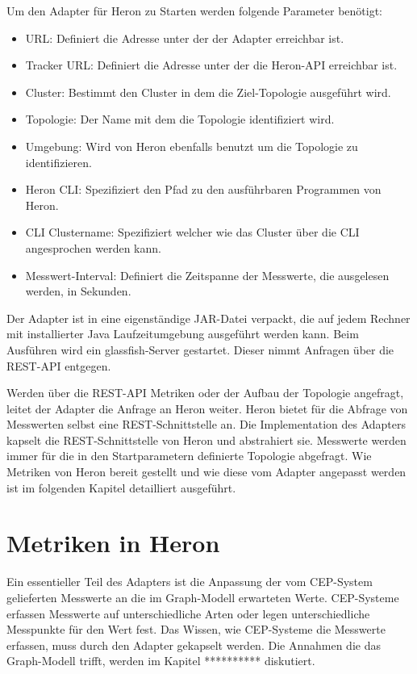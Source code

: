 Um den Adapter für Heron zu Starten werden folgende Parameter benötigt:
\begin{itemize}
\item{URL: Definiert die Adresse unter der der Adapter erreichbar ist.}
\item{Tracker URL: Definiert die Adresse unter der die Heron-API erreichbar ist.}
\item{Cluster: Bestimmt den Cluster in dem die Ziel-Topologie ausgeführt wird.}
\item{Topologie: Der Name mit dem die Topologie identifiziert wird.}
\item{Umgebung: Wird von Heron ebenfalls benutzt um die Topologie zu identifizieren.}
\item{Heron CLI: Spezifiziert den Pfad zu den ausführbaren Programmen von Heron.}
\item{CLI Clustername: Spezifiziert welcher wie das Cluster über die CLI angesprochen werden kann.}
\item{Messwert-Interval: Definiert die Zeitspanne der Messwerte, die ausgelesen werden, in Sekunden.}
\end{itemize}
Der Adapter ist in eine eigenständige JAR-Datei verpackt, die auf jedem Rechner mit installierter Java Laufzeitumgebung ausgeführt werden kann.
Beim Ausführen wird ein glassfish-Server gestartet.
Dieser nimmt Anfragen über die REST-API entgegen.

Werden über die REST-API Metriken oder der Aufbau der Topologie angefragt, leitet der Adapter die Anfrage an Heron weiter.
Heron bietet für die Abfrage von Messwerten selbst eine REST-Schnittstelle an.
Die Implementation des Adapters kapselt die REST-Schnittstelle von Heron und abstrahiert sie.
Messwerte werden immer für die in den Startparametern definierte Topologie abgefragt.
Wie Metriken von Heron bereit gestellt und wie diese vom Adapter angepasst werden ist im folgenden Kapitel detailliert ausgeführt.

\section{Metriken in Heron}

Ein essentieller Teil des Adapters ist die Anpassung der vom CEP-System gelieferten Messwerte an die im Graph-Modell erwarteten Werte.
CEP-Systeme erfassen Messwerte auf unterschiedliche Arten oder legen unterschiedliche Messpunkte für den Wert fest.
Das Wissen, wie CEP-Systeme die Messwerte erfassen, muss durch den Adapter gekapselt werden.
Die Annahmen die das Graph-Modell trifft, werden im Kapitel ********** diskutiert.

